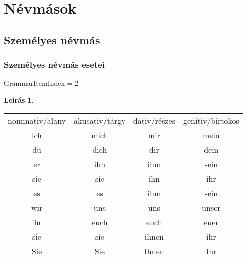 \documentclass{article}
\theoremstyle{definition}
\newtheorem*{desc}{Leírás}
\begin{document}
\section{Névmások}

\subsection{Személyes névmás}

\subsubsection{Személyes névmás esetei}

GrammarItemIndex = 2

\begin{desc}
\begin{tabular}{cccc}
 nominativ/alany & akusativ/tárgy & dativ/részes & genitiv/birtokos \\
 ich & mich & mir & mein \\
 du & dich & dir & dein \\
 er & ihn & ihm & sein \\
 sie & sie & ihn & ihr \\
 es & es & ihm & sein \\
 wir & uns & uns & unser \\
 ihr & euch & euch & euer \\
 sie & sie & ihnen & ihr \\
 Sie & Sie & Ihnen & Ihr \\
\end{tabular}
\end{desc}
\end{document}
